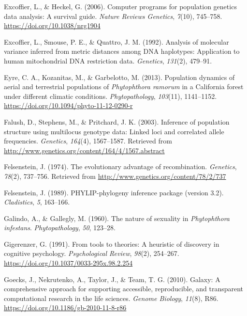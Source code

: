 \documentclass[double,11pt]{beavtex}
\begin{document}
  \hypertarget{ref-excoffier2006computer}{}
  Excoffier, L., \& Heckel, G. (2006). Computer programs for population
  genetics data analysis: A survival guide. \emph{Nature Reviews
  Genetics}, \emph{7}(10), 745--758. \url{https://doi.org/10.1038/nrg1904}
  
  \hypertarget{ref-excoffier1992analysis}{}
  Excoffier, L., Smouse, P. E., \& Quattro, J. M. (1992). Analysis of
  molecular variance inferred from metric distances among DNA haplotypes:
  Application to human mitochondrial DNA restriction data.
  \emph{Genetics}, \emph{131}(2), 479--91.
  
  \hypertarget{ref-eyre2013poulation}{}
  Eyre, C. A., Kozanitas, M., \& Garbelotto, M. (2013). Population
  dynamics of aerial and terrestrial populations of \emph{Phytophthora
  ramorum} in a California forest under different climatic conditions.
  \emph{Phytopathology}, \emph{103}(11), 1141--1152.
  \url{https://doi.org/10.1094/phyto-11-12-0290-r}
  
  \hypertarget{ref-Falush01082003}{}
  Falush, D., Stephens, M., \& Pritchard, J. K. (2003). Inference of
  population structure using multilocus genotype data: Linked loci and
  correlated allele frequencies. \emph{Genetics}, \emph{164}(4),
  1567--1587. Retrieved from
  \url{http://www.genetics.org/content/164/4/1567.abstract}
  
  \hypertarget{ref-felsenstein1974evolutionary}{}
  Felsenstein, J. (1974). The evolutionary advantage of recombination.
  \emph{Genetics}, \emph{78}(2), 737--756. Retrieved from
  \url{http://www.genetics.org/content/78/2/737}
  
  \hypertarget{ref-felsenstein1989phylip}{}
  Felsenstein, J. (1989). PHYLIP-phylogeny inference package (version
  3.2). \emph{Cladistics}, \emph{5}, 163--166.
  
  \hypertarget{ref-galindo1960nature}{}
  Galindo, A., \& Gallegly, M. (1960). The nature of sexuality in
  \emph{Phytophthora infestans}. \emph{Phytopathology}, \emph{50},
  123--28.
  
  \hypertarget{ref-gigerenzer1991tools}{}
  Gigerenzer, G. (1991). From tools to theories: A heuristic of discovery
  in cognitive psychology. \emph{Psychological Review}, \emph{98}(2),
  254--267. \url{https://doi.org/10.1037/0033-295x.98.2.254}
  
  \hypertarget{ref-goecks2010galaxy}{}
  Goecks, J., Nekrutenko, A., Taylor, J., \& Team, T. G. (2010). Galaxy: A
  comprehensive approach for supporting accessible, reproducible, and
  transparent computational research in the life sciences. \emph{Genome
  Biology}, \emph{11}(8), R86.
  \url{https://doi.org/10.1186/gb-2010-11-8-r86}
  
\end{document}
